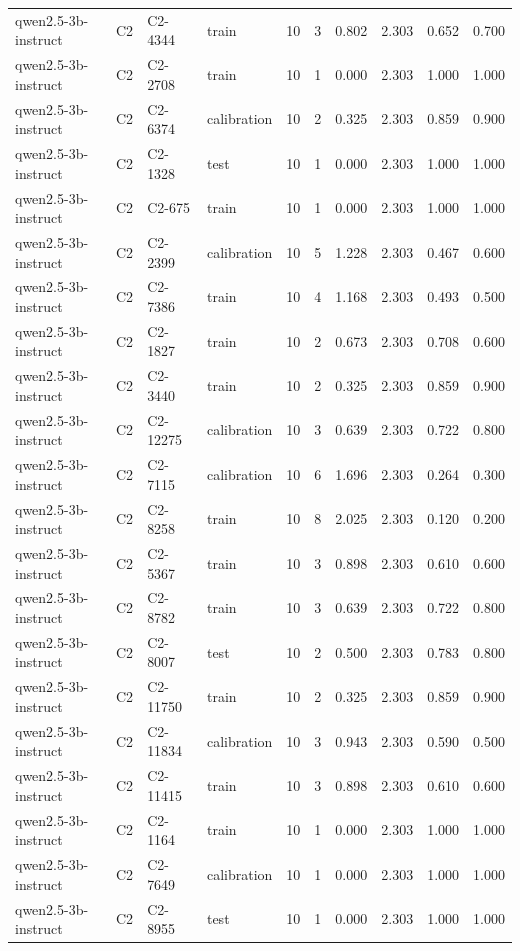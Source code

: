 \begin{table}
\begin{tabular}{llllrrrrrr}
qwen2.5-3b-instruct & C2 & C2-4344 & train & 10 & 3 & 0.802 & 2.303 & 0.652 & 0.700 \\
qwen2.5-3b-instruct & C2 & C2-2708 & train & 10 & 1 & 0.000 & 2.303 & 1.000 & 1.000 \\
qwen2.5-3b-instruct & C2 & C2-6374 & calibration & 10 & 2 & 0.325 & 2.303 & 0.859 & 0.900 \\
qwen2.5-3b-instruct & C2 & C2-1328 & test & 10 & 1 & 0.000 & 2.303 & 1.000 & 1.000 \\
qwen2.5-3b-instruct & C2 & C2-675 & train & 10 & 1 & 0.000 & 2.303 & 1.000 & 1.000 \\
qwen2.5-3b-instruct & C2 & C2-2399 & calibration & 10 & 5 & 1.228 & 2.303 & 0.467 & 0.600 \\
qwen2.5-3b-instruct & C2 & C2-7386 & train & 10 & 4 & 1.168 & 2.303 & 0.493 & 0.500 \\
qwen2.5-3b-instruct & C2 & C2-1827 & train & 10 & 2 & 0.673 & 2.303 & 0.708 & 0.600 \\
qwen2.5-3b-instruct & C2 & C2-3440 & train & 10 & 2 & 0.325 & 2.303 & 0.859 & 0.900 \\
qwen2.5-3b-instruct & C2 & C2-12275 & calibration & 10 & 3 & 0.639 & 2.303 & 0.722 & 0.800 \\
qwen2.5-3b-instruct & C2 & C2-7115 & calibration & 10 & 6 & 1.696 & 2.303 & 0.264 & 0.300 \\
qwen2.5-3b-instruct & C2 & C2-8258 & train & 10 & 8 & 2.025 & 2.303 & 0.120 & 0.200 \\
qwen2.5-3b-instruct & C2 & C2-5367 & train & 10 & 3 & 0.898 & 2.303 & 0.610 & 0.600 \\
qwen2.5-3b-instruct & C2 & C2-8782 & train & 10 & 3 & 0.639 & 2.303 & 0.722 & 0.800 \\
qwen2.5-3b-instruct & C2 & C2-8007 & test & 10 & 2 & 0.500 & 2.303 & 0.783 & 0.800 \\
qwen2.5-3b-instruct & C2 & C2-11750 & train & 10 & 2 & 0.325 & 2.303 & 0.859 & 0.900 \\
qwen2.5-3b-instruct & C2 & C2-11834 & calibration & 10 & 3 & 0.943 & 2.303 & 0.590 & 0.500 \\
qwen2.5-3b-instruct & C2 & C2-11415 & train & 10 & 3 & 0.898 & 2.303 & 0.610 & 0.600 \\
qwen2.5-3b-instruct & C2 & C2-1164 & train & 10 & 1 & 0.000 & 2.303 & 1.000 & 1.000 \\
qwen2.5-3b-instruct & C2 & C2-7649 & calibration & 10 & 1 & 0.000 & 2.303 & 1.000 & 1.000 \\
qwen2.5-3b-instruct & C2 & C2-8955 & test & 10 & 1 & 0.000 & 2.303 & 1.000 & 1.000 \\

\end{tabular}
\end{table}
